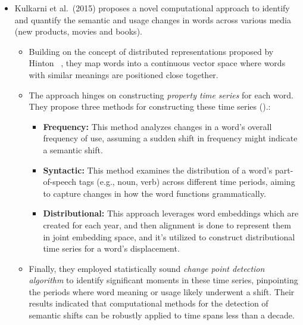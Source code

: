 \begin{itemize}
    \item {}
    Kulkarni et al.\ (2015) proposes a novel computational approach to identify and quantify the semantic and usage changes in words across various media (new products, movies and books).
    \begin{itemize}
        \item Building on the concept of distributed representations proposed by Hinton ~\cite{hinton1986learning}, they map words into a continuous vector space where words with similar meanings are positioned close together.
        \item The approach hinges on constructing \emph{property time series} for each word.
        They propose three methods for constructing these time series ().:
        \begin{itemize}
            \item \textbf{Frequency:}
            This method analyzes changes in a word's overall frequency of use, assuming a sudden shift in frequency might indicate a semantic shift.
            \item \textbf{Syntactic:}
            This method examines the distribution of a word's part-of-speech tags (e.g., noun, verb) across different time periods, aiming to capture changes in how the word functions grammatically.
            \item \textbf{Distributional:}
            This approach leverages word embeddings which are created for each year, and then alignment is done to represent them in joint embedding space,
            and it's utilized to construct distributional time series for a word's displacement.
        \end{itemize}
        \item Finally, they employed statistically sound \emph{change point detection algorithm} to identify significant moments in these time series, pinpointing the periods where word meaning or usage likely underwent a shift.
        Their results indicated that computational methods for the detection of semantic shifts can be robustly applied to time spans less than a decade.
    \end{itemize}


\end{itemize}
